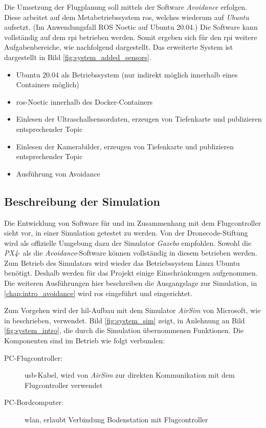 Die Umsetzung der Flugplanung soll mittels der Software \textit{Avoidance} erfolgen. Diese arbeitet auf dem Metabetriebssystem \acrshort{ros}, welches wiederum auf \textit{Ubuntu} aufsetzt. (Im Anwendungsfall ROS Noetic auf Ubuntu 20.04.) Die Software kann vollständig auf dem \gls{rpi} betrieben werden. Somit ergeben sich für den \gls{rpi} weitere Aufgabenbereiche, wie nachfolgend dargestellt. Das erweiterte System ist dargestellt in Bild \ref{fig:system_added_sensors}.

\begin{itemize}
    \item Ubuntu 20.04 als Betriebssystem (nur indirekt möglich innerhalb eines Containers möglich)
    \item \acrshort{ros}-Noetic innerhalb des Docker-Containers
    \item Einlesen der Ultraschallsensordaten, erzeugen von Tiefenkarte und publizieren entsprechender Topic
    \item Einlesen der Kamerabilder, erzeugen von Tiefenkarte und publizieren entsprechender Topic
    \item Ausführung von Avoidance
\end{itemize}

\subsection{Beschreibung der Simulation}\label{chap:intro_simulation}
Die Entwicklung von Software für und im Zusammenhang mit dem Flugcontroller sieht vor, in einer Simulation getestet zu werden. Von der Dronecode-Stiftung wird als offizielle Umgebung dazu der Simulator \textit{Gazebo} empfohlen\cite{dronecodestiftungSimulationPX4User}. Sowohl die \textit{PX4}- als die \textit{Avoidance}-Software können vollständig in diesem betrieben werden. Zum Betrieb des Simulators wird wieder das Betriebssystem Linux Ubuntu benötigt. Deshalb werden für das Projekt einige Einschränkungen aufgenommen. Die weiteren Ausführungen hier beschreiben die Ausgangslage zur Simulation, in \cref{chap:intro_avoidance} wird \acrshort{ros} eingeführt und eingerichtet.

Zum Vorgehen wird der \gls{hil}-Aufbau mit dem Simulator \textit{AirSim} von Microsoft\cite{microsoftcorporationWelcomeAirSim2023}, wie in \cite[Kapitel 3.4.1]{markusreinErweiterungBestehenderDrohnen2023} beschrieben, verwendet. Bild \ref{fig:system_sim} zeigt, in Anlehnung an Bild \ref{fig:system_intro}, die durch die Simulation übernommenen Funktionen. Die Komponenten sind im Betrieb wie folgt verbunden:
\begin{description}
    \item[PC-Flugcontroller:] \acrshort{usb}-Kabel, wird von \textit{AirSim} zur direkten Kommunikation mit dem Flugcontroller verwendet
    \item[PC-Bordcomputer:] \acrshort{wlan}, erlaubt Verbindung Bodenstation mit Flugcontroller
\end{description}

